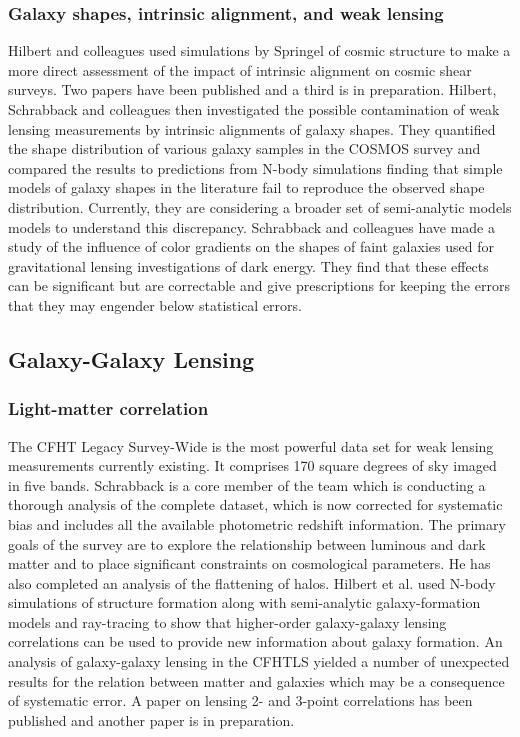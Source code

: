 \documentclass[psfig,11pt]{article}
\begin{document}
\subsubsection{Galaxy shapes, intrinsic alignment, and weak lensing}
Hilbert and colleagues used simulations by Springel of cosmic structure to make a more direct assessment of the impact of intrinsic alignment on cosmic shear surveys.  Two papers have been published and a third is in preparation. Hilbert, Schrabback and colleagues then investigated the possible contamination of weak lensing measurements by intrinsic alignments of galaxy shapes. They quantified the shape distribution of various galaxy samples in the COSMOS survey and compared the results to predictions from N-body simulations finding that simple models of galaxy shapes in the literature fail to reproduce the observed shape distribution. Currently, they are considering a broader set of semi-analytic models models to understand this discrepancy. Schrabback and colleagues have made a study of the influence of color gradients on the shapes of faint galaxies used for gravitational lensing investigations of dark energy. They find that these effects can be significant but are correctable and give prescriptions for keeping the errors that they may engender below statistical errors.
\subsection{Galaxy-Galaxy Lensing}
\subsubsection{Light-matter correlation}
The CFHT Legacy Survey-Wide is the most powerful data set for weak lensing measurements currently existing. It comprises 170 square degrees of sky imaged in five bands.  Schrabback is a core member of the team which is conducting a thorough analysis of the complete dataset, which is now corrected for systematic bias and includes all the available photometric redshift information. The primary goals of the survey are to explore the relationship between luminous and dark matter and to place significant constraints on cosmological parameters. He has also completed an analysis of  the flattening of halos. Hilbert et al. used N-body simulations of structure formation along with semi-analytic galaxy-formation models and ray-tracing to show that higher-order galaxy-galaxy lensing correlations can be used to provide new information about galaxy formation. An analysis of galaxy-galaxy lensing in the CFHTLS yielded a number of unexpected results for the relation between matter and galaxies which may be a consequence of systematic error. A paper on lensing 2- and 3-point correlations has been published and another paper is in preparation.
\end{document}
